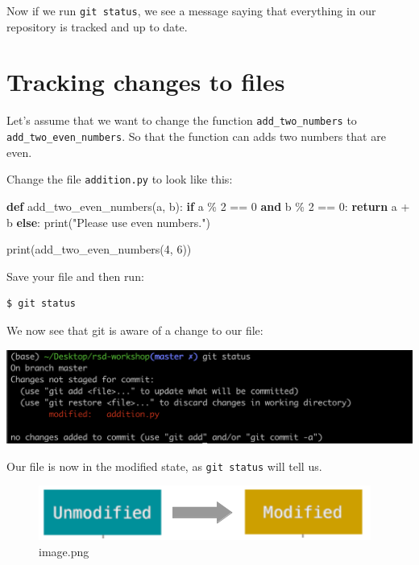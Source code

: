 \documentclass[11pt]{article}
\newenvironment{Shaded}{}{}
\newcommand{\KeywordTok}[1]{\textcolor[rgb]{0.00,0.44,0.13}{\textbf{{#1}}}}
\newcommand{\DecValTok}[1]{\textcolor[rgb]{0.25,0.63,0.44}{{#1}}}
\newcommand{\StringTok}[1]{\textcolor[rgb]{0.25,0.44,0.63}{{#1}}}
\newcommand{\NormalTok}[1]{{#1}}
\newcommand{\ControlFlowTok}[1]{\textcolor[rgb]{0.00,0.44,0.13}{\textbf{{#1}}}}
\newcommand{\OperatorTok}[1]{\textcolor[rgb]{0.40,0.40,0.40}{{#1}}}
\newcommand{\BuiltInTok}[1]{{#1}}
\begin{document}
    Now if we run \texttt{git\ status}, we see a message saying that
everything in our repository is tracked and up to date.

    \hypertarget{tracking-changes-to-files}{%
\section{Tracking changes to files}\label{tracking-changes-to-files}}

Let's assume that we want to change the function
\texttt{add\_two\_numbers} to \texttt{add\_two\_even\_numbers}. So that
the function can adds two numbers that are even.

Change the file \texttt{addition.py} to look like this:

\begin{Shaded}
\begin{Highlighting}[]
\KeywordTok{def}\NormalTok{ add\_two\_even\_numbers(a, b):}
    \ControlFlowTok{if}\NormalTok{ a }\OperatorTok{\%} \DecValTok{2} \OperatorTok{==} \DecValTok{0} \KeywordTok{and}\NormalTok{ b }\OperatorTok{\%} \DecValTok{2} \OperatorTok{==} \DecValTok{0}\NormalTok{:}
        \ControlFlowTok{return}\NormalTok{ a }\OperatorTok{+}\NormalTok{ b}
    \ControlFlowTok{else}\NormalTok{:}
        \BuiltInTok{print}\NormalTok{(}\StringTok{"Please use even numbers."}\NormalTok{)}
    
\BuiltInTok{print}\NormalTok{(add\_two\_even\_numbers(}\DecValTok{4}\NormalTok{, }\DecValTok{6}\NormalTok{))}
\end{Highlighting}
\end{Shaded}

Save your file and then run:

\begin{verbatim}
$ git status
\end{verbatim}

We now see that git is aware of a change to our file:

\includegraphics{static/modified.png}

    Our file is now in the modified state, as \texttt{git\ status} will tell
us.

\begin{figure}
\centering
\includegraphics{static/to_modified.png}
\caption{image.png}
\end{figure}
\end{document}
